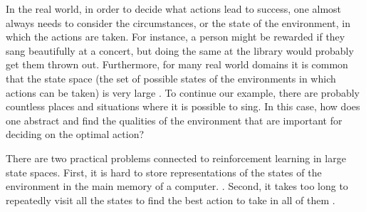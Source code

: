 In the real world, in order to decide what actions lead to success, one almost always needs to consider the circumstances, or the state of the environment, in which the actions are taken. For instance, a person might be rewarded if they sang beautifully at a concert, but doing the same at the library would probably get them thrown out. Furthermore, for many real world domains it is common that the state space (the set of possible states of the environments in which actions can be taken) is very large \parencite{guestrin2003efficient}. To continue our example, there are probably countless places and situations where it is possible to sing. In this case, how does one abstract and find the qualities of the environment that are important for deciding on the optimal action?


There are two practical problems connected to reinforcement learning in large state spaces. First, it is hard to store representations of the states of the environment in the main memory of a computer.  \parencite{szepesvari2010algorithms}. Second, it takes too long to repeatedly visit all the states to find the best action to take in all of them \parencite{dietterich2013pac}.
